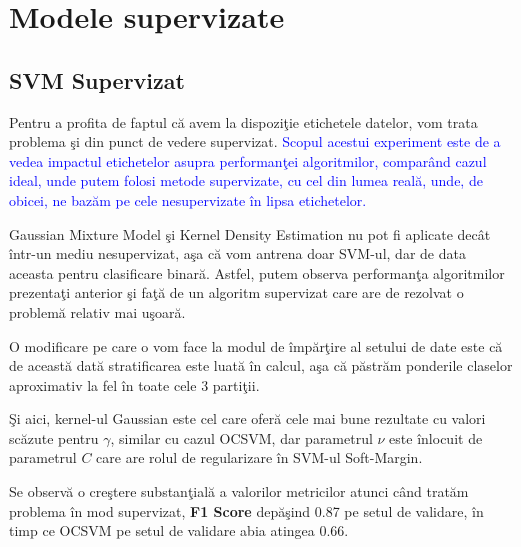 \section{Modele supervizate}

\subsection{SVM Supervizat}

Pentru a profita de faptul că avem la dispoziţie etichetele datelor, vom trata 
problema şi din punct de vedere supervizat. \textcolor{blue}{Scopul acestui experiment
este de a vedea impactul etichetelor asupra performanţei algoritmilor, 
comparând cazul ideal, unde putem folosi metode supervizate, cu cel din lumea reală,
unde, de obicei, ne bazăm pe cele nesupervizate în lipsa etichetelor.}

Gaussian Mixture Model şi Kernel 
Density Estimation nu pot fi aplicate decât într-un mediu nesupervizat, aşa 
că vom antrena doar SVM-ul, dar de data aceasta pentru clasificare binară.
Astfel, putem observa performanţa algoritmilor prezentaţi anterior şi faţă 
de un algoritm supervizat care are de rezolvat o problemă relativ mai uşoară.

O modificare pe care o vom face la modul de împărţire al setului de date 
este că de această dată stratificarea este luată în calcul, aşa că păstrăm 
ponderile claselor aproximativ la fel în toate cele 3 partiţii.

Şi aici, kernel-ul Gaussian este cel care oferă cele mai bune rezultate cu 
valori scăzute pentru $\gamma$, similar cu cazul OCSVM, dar parametrul 
$\nu$ este înlocuit
de parametrul $C$ care are rolul de regularizare în SVM-ul Soft-Margin.

Se observă o creştere substanţială a valorilor metricilor atunci când tratăm 
problema în mod supervizat, \textbf{F1 Score} 
depăşind 0.87 pe setul de validare, în timp ce 
OCSVM pe setul de validare abia atingea 0.66.

